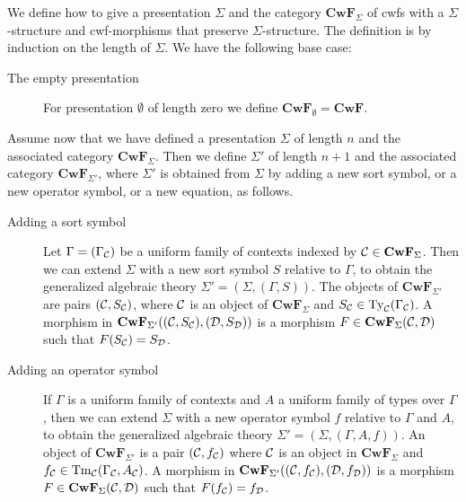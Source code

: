 \documentclass{lmcs}
\newcommand{\FYI}[1]{{\color{red}#1}}
\def\D{\mathcal{D}}
\def\Cwf{\mathbf{CwF}}
\begin{document}
\begin{definition}\label{def-sig-mod}
We define how to \FYI{give a presentation} $\Sigma$ and the category $\Cwf_\Sigma$ of cwfs with a $\Sigma$-structure and cwf-morphisms that preserve $\Sigma$-structure. The definition is by induction on the length of $\Sigma$. We have the following base case:
\begin{description}
\item[The empty \FYI{presentation}] For \FYI{presentation} $\emptyset$ of length zero we define $\Cwf_\emptyset = \Cwf$.
\end{description}
Assume now that we have defined a \FYI{presentation} $\Sigma$ of length $n$ and the associated
category $\Cwf_{\Sigma}$.
Then we define $\Sigma'$ of length $n+1$ and the associated category $\Cwf_{\Sigma'}$, where $\Sigma'$ is obtained from $\Sigma$ by adding a new sort symbol, or a new operator symbol, or a new equation, as follows.
\begin{description}
\item[Adding a sort symbol]
  Let $\Gamma = (\Gamma_{\mathcal C})$ be a uniform family of contexts indexed by $\C \in \Cwf_{\Sigma}$.
  Then we can extend $\Sigma$ with a new sort symbol $S$ relative to $\Gamma$, to obtain
  the generalized algebraic theory $\Sigma' = (\Sigma,(\Gamma,S))$.
  The objects of $\Cwf_{\Sigma'}$ are pairs $({\mathcal C},S_{{\mathcal C}})$, where ${\mathcal C}$ is an object of $\Cwf_{\Sigma}$
  and $S_{{\mathcal C}} \in \mathrm{Ty}_{\mathcal C}(\Gamma_{{\mathcal C}})$.
  A morphism in $\Cwf_{\Sigma'}((\C,S_{\C}), (\D,S_{\D}))$
  is a morphism $F \in \Cwf_{\Sigma}(\C,\D)$ such that $F(S_\C) = S_\D$.
\item[Adding an operator symbol]
  If $\Gamma$ is a uniform family of contexts and $A$ a uniform family of
  types over $\Gamma$,
  then we can extend $\Sigma$ with a new operator
  symbol $f$ relative to $\Gamma$ and $A$, to obtain
  the generalized algebraic theory $\Sigma' = (\Sigma,(\Gamma,A,f))$.
  An object of $\Cwf_{\Sigma'}$
  is a pair $({\mathcal C},f_{{\mathcal C}})$ where ${\mathcal C}$ is an object in $\Cwf_{\Sigma}$ and $f_{{\mathcal C}} \in \mathrm{Tm}_{\mathcal C}(\Gamma_{\mathcal C},A_{\mathcal C})$.
  A morphism in $\Cwf_{\Sigma'}((\C,f_{\C}),(\D,f_{\D}))$ is a morphism $F \in \Cwf_{\Sigma}(\C,\D)$ such that $F(f_{\C}) = f_{\D}$.

\end{description}
\end{definition}
\end{document}
